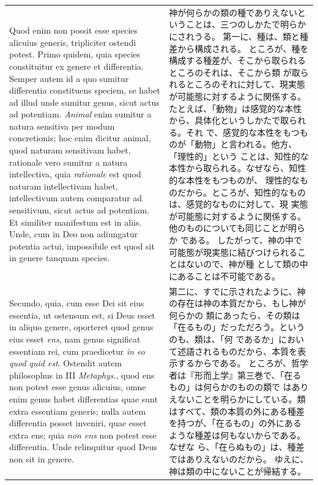 \documentclass[paper=a4paper,fontsize=10pt,jafontsize=9pt,titlepage]{jlreq}
\begin{document}
\begin{longtable}{p{21em}p{21em}}
\\
Quod enim non possit esse species alicuius generis, tripliciter ostendi
 potest.  Primo quidem, quia species constituitur ex genere et
 differentia.  Semper autem id a quo sumitur differentia constituens
 speciem, se habet ad illud unde sumitur genus, sicut actus ad
 potentiam.  {\itshape Animal} enim sumitur a natura sensitiva per modum
 concretionis; hoc enim dicitur animal, quod naturam sensitivam habet,
 rationale vero sumitur a natura intellectiva, quia {\itshape rationale}
 est quod naturam intellectivam habet, intellectivum autem comparatur ad
 sensitivum, sicut actus ad potentiam. Et similiter manifestum est in
 aliis.  Unde, cum in Deo non adiungatur potentia actui, impossibile est
 quod sit in genere tanquam species.

&
神が何らかの類の種でありえないということは、三つのしかたで明らかにされうる。
第一に、種は、類と種差から構成される。
ところが、種を構成する種差が、そこから取られるところのそれは、そこから類
 が取られるところのそれに対して、現実態が可能態に対するように関係する。
たとえば、「動物」は感覚的な本性から、具体化というしかたで取られる。それ
 で、感覚的な本性をもつものが「動物」と言われる。他方、「理性的」という
 ことは、知性的な本性から取られる。なぜなら、知性的な本性をもつものが、
 理性的なものだから。ところが、知性的なものは、感覚的なものに対して、現
 実態が可能態に対するように関係する。他のものについても同じことが明らか
 である。
したがって、神の中で可能態が現実態に結びつけられることはないので、神が種
 として類の中にあることは不可能である。

\\

Secundo, quia, cum esse Dei sit eius essentia, ut ostensum est, si Deus
 esset in aliquo genere, oporteret quod genus eius esset {\itshape ens}, nam genus
 significat essentiam rei, cum praedicetur {\itshape in eo quod quid est}.
Ostendit autem philosophus in III {\itshape Metaphys}., quod ens non potest esse
 genus alicuius, omne enim genus habet differentias quae sunt extra
 essentiam generis; nulla autem differentia posset inveniri, quae esset
 extra ens; quia {\itshape non ens} non potest esse differentia.
Unde relinquitur quod Deus non sit in genere.

&

第二に、すでに示されたように、神の存在は神の本質だから、もし神が何らかの
 類にあったら、その類は「在るもの」だっただろう。というのも、類は、「何
 であるか」において述語されるものだから、本質を表示するからである。
ところが、哲学者は『形而上学』第三巻で、「在るもの」は何らかのものの類で
 はありえないことを明らかにしている。類はすべて、類の本質の外にある種差
 を持つが、「在るもの」の外にあるような種差は何もないからである。なぜな
 ら、「在らぬもの」は、種差ではありえないのだから。
ゆえに、神は類の中にないことが帰結する。


\end{longtable}
\end{document}
